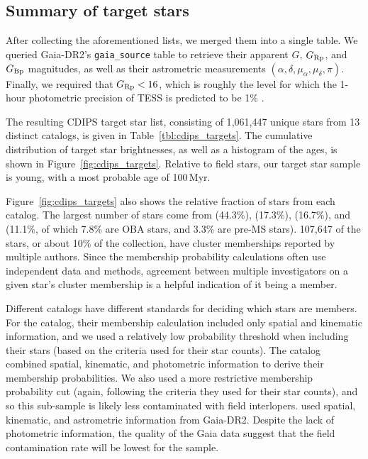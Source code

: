 \documentclass[12pt,twocolumn,tighten]{aastex62}
\begin{document}
\subsection{Summary of target stars}
\label{subsec:ocmgsummary}


After collecting the aforementioned lists, we merged them into a
single table. We queried Gaia-DR2's \texttt{gaia\_source} table to
retrieve their apparent $G$, $G_{\rm Rp}$, and $G_{\rm Bp}$
magnitudes, as well as their astrometric measurements $(\alpha,
\delta, \mu_\alpha, \mu_\delta, \pi)$.  Finally, we required that
$G_{\rm Rp} < 16$, which is roughly the level for which
the 1-hour photometric
precision of TESS is predicted to be 1\%
\citep{ricker_transiting_2015}.

The resulting CDIPS target star list, consisting of 1{,}061{,}447 unique stars from 13
distinct catalogs, is given in
Table~\ref{tbl:cdips_targets}.  The cumulative distribution of target
star brightnesses, as well as a histogram of the ages, is shown in
Figure~\ref{fig:cdips_targets}.  Relative to field stars, our target
star sample is young, with a most probable age of 100$\,$Myr.

Figure~\ref{fig:cdips_targets} also shows
the relative fraction of stars from each catalog.
The largest number of stars come from \citealt{dias_proper_2014}
(44.3\%), \citealt{Kharchenko_et_al_2013} (17.3\%),
\citealt{cantat-gaudin_gaia_2018} (16.7\%), and \citealt{zari_3d_2018}
(11.1\%, of which 7.8\% are OBA stars, and 3.3\% are pre-MS stars).
107{,}647 of the stars, or about 10\%
of the collection, have cluster memberships reported by multiple
authors.  Since the membership probability calculations often use
independent data and methods, agreement between multiple investigators
on a given star's cluster membership is a helpful indication of it
being a member.

Different catalogs have different standards for deciding
which stars are members.  For the
\citet{dias_proper_2014} catalog, their membership calculation
included only spatial and kinematic information, and we used a
relatively low probability threshold when including their stars (based
on the criteria \citealt{dias_proper_2014} used for their star
counts).  The \citet{Kharchenko_et_al_2013} catalog combined spatial,
kinematic, and photometric information to derive their membership
probabilities.  We also used a more restrictive membership
probability cut (again, following the criteria they used for their
star counts), and so this sub-sample is likely less contaminated
with field interlopers.
\citet{cantat-gaudin_gaia_2018} used spatial, kinematic, and
astrometric information from Gaia-DR2. Despite the lack of
photometric information, the quality of the Gaia data suggest that the
field contamination rate will be lowest for the
\citet{cantat-gaudin_gaia_2018} sample.
\end{document}
